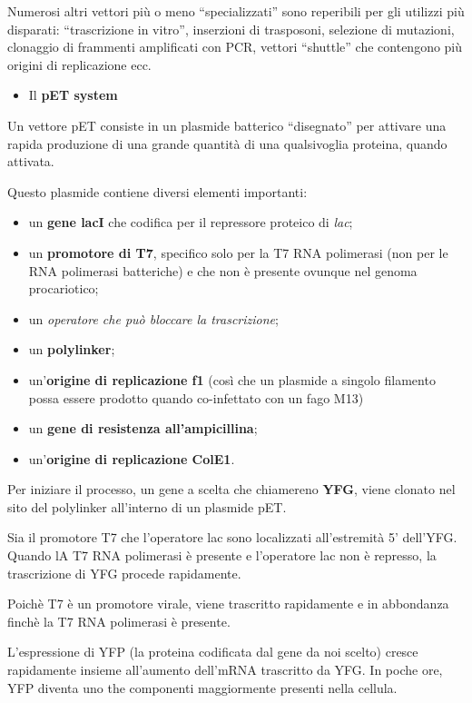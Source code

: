 \documentclass[11pt]{book}
\begin{document}
Numerosi altri vettori più o meno ``specializzati'' sono reperibili per
gli utilizzi più disparati: ``trascrizione in vitro'', inserzioni di
trasposoni, selezione di mutazioni, clonaggio di frammenti amplificati
con PCR, vettori ``shuttle'' che contengono più origini di replicazione
ecc.

\begin{itemize}
\itemsep1pt\parskip0pt
\item
  Il \textbf{pET system}
\end{itemize}

Un vettore pET consiste in un plasmide batterico ``disegnato'' per
attivare una rapida produzione di una grande quantità di una
qualsivoglia proteina, quando attivata.

Questo plasmide contiene diversi elementi importanti:

\begin{itemize}
\itemsep1pt\parskip0pt
\item
  un \textbf{gene lacI} che codifica per il repressore proteico di
  \emph{lac};
\item
  un \textbf{promotore di T7}, specifico solo per la T7 RNA polimerasi
  (non per le RNA polimerasi batteriche) e che non è presente ovunque
  nel genoma procariotico;
\item
  un \emph{operatore che può bloccare la trascrizione};
\item
  un \textbf{polylinker};
\item
  un'\textbf{origine di replicazione f1} (così che un plasmide a singolo
  filamento possa essere prodotto quando co-infettato con un fago M13)
\item
  un \textbf{gene di resistenza all'ampicillina};
\item
  un'\textbf{origine di replicazione ColE1}.
\end{itemize}

Per iniziare il processo, un gene a scelta che chiamereno \textbf{YFG},
viene clonato nel sito del polylinker all'interno di un plasmide pET.

Sia il promotore T7 che l'operatore lac sono localizzati all'estremità
5' dell'YFG. Quando lA T7 RNA polimerasi è presente e l'operatore lac
non è represso, la trascrizione di YFG procede rapidamente.

Poichè T7 è un promotore virale, viene trascritto rapidamente e in
abbondanza finchè la T7 RNA polimerasi è presente.

L'espressione di YFP (la proteina codificata dal gene da noi scelto)
cresce rapidamente insieme all'aumento dell'mRNA trascritto da YFG. In
poche ore, YFP diventa uno the componenti maggiormente presenti nella
cellula.
\end{document}
